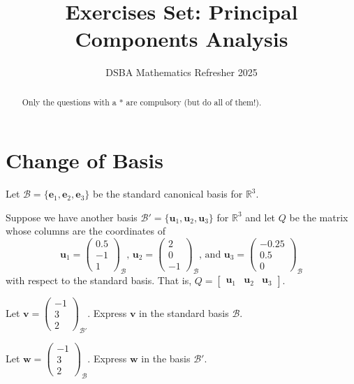 \documentclass[]{article}
\title{Exercises Set: Principal Components Analysis}
\author{DSBA Mathematics Refresher 2025}
\date{}
\begin{document}
	
	\maketitle
	
	\begin{abstract}
		Only the questions with a * are compulsory (but do all of them!).
	\end{abstract}	
	
	\section{Change of Basis}

	Let $\mathcal{B} = \{ \mathbf{e}_1, \mathbf{e}_2, \mathbf{e}_3 \}$ be the standard canonical basis for $\mathbb{R}^3$.

	Suppose we have another basis $\mathcal{B}' = \{ \mathbf{u}_1, \mathbf{u}_2, \mathbf{u}_3 \}$ for $\mathbb{R}^3$ and let $Q$ be the matrix whose columns are the coordinates of 
	$$
	\mathbf{u}_1 = \begin{pmatrix} 0.5 \\ -1 \\ 1 \end{pmatrix}_{\mathcal{B}}
	\textit{, }
	\mathbf{u}_2 = \begin{pmatrix} 2 \\ 0 \\ -1 \end{pmatrix}_{\mathcal{B}}
	\text{, and }
	\mathbf{u}_3 = \begin{pmatrix} -0.25 \\ 0.5 \\ 0 \end{pmatrix}_{\mathcal{B}}
	$$
	with respect to the standard basis.
	That is, $
	Q = \begin{bmatrix}
		\mathbf{u}_1 & \mathbf{u}_2 & \mathbf{u}_3
	\end{bmatrix}
	$.
	
	Let $\mathbf{v} = \begin{pmatrix} -1 \\ 3 \\ 2 \end{pmatrix}_{\mathcal{B}'}$.
	Express $\mathbf{v}$ in the standard basis $\mathcal{B}$.
	
	Let $\mathbf{w} = \begin{pmatrix} -1 \\ 3 \\ 2 \end{pmatrix}_{\mathcal{B}}$.
	Express $\mathbf{w}$ in the basis $\mathcal{B}'$.
	
\end{document}
